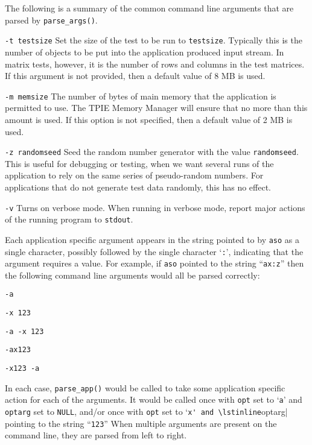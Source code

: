 The following is a summary of the common command line arguments that
are parsed by \lstinline|parse_args()|.
\begin{description}
\item\lstinline|-t testsize| Set the size of the test to be run to
  \lstinline|testsize|.  Typically this is the number of objects to be
  put into the application produced input stream.  In matrix tests,
  however, it is the number of rows and columns in the test matrices.
  If this argument is not provided, then a default value of 8 MB is
  used.
\item\lstinline|-m memsize| The number of bytes of main memory that
  the application is permitted to use.  The TPIE Memory
  Manager will ensure that no more than this
  amount is used.  If this option is not specified, then a default
  value of 2 MB is used.
\item\lstinline|-z randomseed| Seed the random number generator with
  the value \lstinline|randomseed|.  This is useful for debugging or
  testing, when we want several runs of the application to rely on the
  same series of pseudo-random numbers.  For applications that do not
  generate test data randomly, this has no effect.
\item\lstinline|-v| Turns on verbose mode.  When running in verbose
  mode, report major actions of the running program to
  \lstinline|stdout|.
\end{description}

Each application specific argument appears in the string pointed to by
\lstinline|aso| as a single character, possibly followed by the single
character `\lstinline|:|', indicating that the argument requires a
value.  For example, if \lstinline|aso| pointed to the string
``\lstinline|ax:z|'' then the following command line arguments would
all be parsed correctly:

\begin{description}
\item\lstinline|-a|
\item\lstinline|-x 123|
\item\lstinline|-a -x 123|
\item\lstinline|-ax123|
\item\lstinline|-x123 -a|
\end{description}

In each case, \lstinline|parse_app()| would be called to take some
application specific action for each of the arguments.  It would be
called once with \lstinline|opt| set to `\lstinline|a|' and
\lstinline|optarg| set to \lstinline|NULL|, and/or once with
\lstinline|opt| set to `\lstinline|x' and \lstinline|optarg| pointing
to the string ``\lstinline|123|''  When multiple arguments are present
on the command line, they are parsed from left to right.

